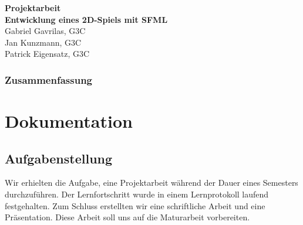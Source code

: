 \documentclass[11pt,a4paper]{scrbook}
\begin{document}
\begin{titlepage}
\begin{center}

\vspace*{3cm}
\textbf{\huge{Projektarbeit}}\\
\vspace*{2cm}
\textbf{\large{Entwicklung eines 2D-Spiels mit SFML}}\\
\vspace*{5cm}
Gabriel Gavrilas, G3C\\
Jan Kunzmann, G3C\\
Patrick Eigensatz, G3C
\end{center}
\end{titlepage}


\clearpage
\thispagestyle{empty}


\section*{Zusammenfassung}


\thispagestyle{empty}
\clearscrheadfoot
\lofoot[\pagemark]{\pagemark}
\thispagestyle{empty}
\tableofcontents

\clearpage
{}


\part{Dokumentation}
\chapter{Aufgabenstellung}
Wir erhielten die Aufgabe, eine Projektarbeit während der Dauer eines Semesters durchzuführen. Der Lernfortschritt wurde in einem Lernprotokoll laufend festgehalten.
Zum Schluss erstellten wir eine schriftliche Arbeit und eine Präsentation. Diese Arbeit soll uns auf die Maturarbeit vorbereiten.
\end{document}
